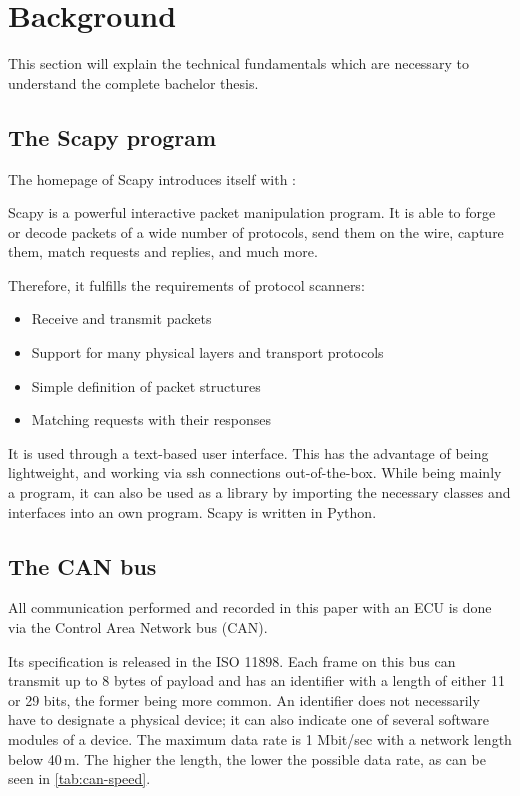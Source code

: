 \chapter{Background}

This section will explain the technical fundamentals which are necessary to understand the complete bachelor thesis.

\section{The Scapy program}
\label{sec:scapy}

The homepage of Scapy introduces itself with \cite{scapy}:
\begin{displayquote}
Scapy is a powerful interactive packet manipulation program. It is able to forge or decode packets of a wide number of protocols, send them on the wire, capture them, match requests and replies, and much more.
\end{displayquote}

Therefore, it fulfills the requirements of protocol scanners:
\begin{itemize}
    \item Receive and transmit packets
    \item Support for many physical layers and transport protocols
    \item Simple definition of packet structures
    \item Matching requests with their responses
\end{itemize} 

It is used through a text-based user interface. This has the advantage of being lightweight, and working via ssh connections out-of-the-box. While being mainly a program, it can also be used as a library by importing the necessary classes and interfaces into an own program. Scapy is written in Python.


\section{The CAN bus}

All communication performed and recorded in this paper with an ECU is done via the Control Area Network bus (CAN).

Its specification is released in the ISO 11898. Each frame on this bus can transmit up to 8 bytes of payload and has an identifier with a length of either 11 or 29 bits, the former being more common. An identifier does not necessarily have to designate a physical device; it can also indicate one of several software modules of a device.
The maximum data rate is 1 Mbit/sec with a network length below 40\,m. The higher the length, the lower the possible data rate, as can be seen in \autoref{tab:can-speed}.

